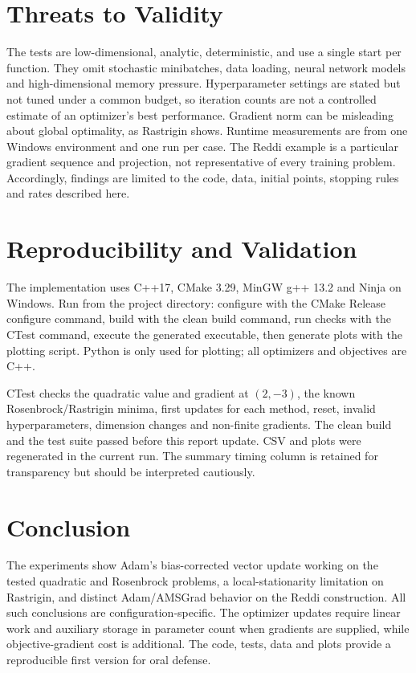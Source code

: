 \documentclass[conference]{IEEEtran}
\begin{document}
\section{Threats to Validity}
The tests are low-dimensional, analytic, deterministic, and use a single start per function. They omit stochastic minibatches, data loading, neural network models and high-dimensional memory pressure. Hyperparameter settings are stated but not tuned under a common budget, so iteration counts are not a controlled estimate of an optimizer's best performance. Gradient norm can be misleading about global optimality, as Rastrigin shows. Runtime measurements are from one Windows environment and one run per case. The Reddi example is a particular gradient sequence and projection, not representative of every training problem. Accordingly, findings are limited to the code, data, initial points, stopping rules and rates described here.
\section{Reproducibility and Validation}
The implementation uses C++17, CMake 3.29, MinGW g++ 13.2 and Ninja on Windows. Run from the project directory: configure with the CMake Release configure command, build with the clean build command, run checks with the CTest command, execute the generated executable, then generate plots with the plotting script. Python is only used for plotting; all optimizers and objectives are C++.

CTest checks the quadratic value and gradient at $(2,-3)$, the known Rosenbrock/Rastrigin minima, first updates for each method, reset, invalid hyperparameters, dimension changes and non-finite gradients. The clean build and the test suite passed before this report update. CSV and plots were regenerated in the current run. The summary timing column is retained for transparency but should be interpreted cautiously.
\section{Conclusion}
The experiments show Adam's bias-corrected vector update working on the tested quadratic and Rosenbrock problems, a local-stationarity limitation on Rastrigin, and distinct Adam/AMSGrad behavior on the Reddi construction. All such conclusions are configuration-specific. The optimizer updates require linear work and auxiliary storage in parameter count when gradients are supplied, while objective-gradient cost is additional. The code, tests, data and plots provide a reproducible first version for oral defense.
\end{document}
